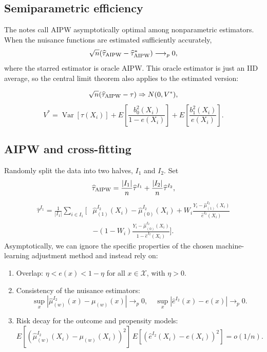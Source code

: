 \subsection{Semiparametric efficiency}
The notes call AIPW asymptotically optimal among nonparametric estimators. When the nuisance functions are estimated sufficiently accurately,
\[
\sqrt n(\widehat\tau_{\rm AIPW}-\widehat\tau^*_{\rm AIPW})\longrightarrow_p0,
\]
where the starred estimator is oracle AIPW. This oracle estimator is just an IID average, so the central limit theorem also applies to the estimated version:

\[
\sqrt n(\widehat\tau_{\rm AIPW}-\tau)\Rightarrow N(0,V^*),
\]
\[
V^*=\operatorname{Var}[\tau(X_i)]
+E\left[\frac{b_0^2(X_i)}{1-e(X_i)}\right]
+E\left[\frac{b_1^2(X_i)}{e(X_i)}\right].
\]
\subsection{AIPW and cross-fitting}
Randomly split the data into two halves, $I_1$ and $I_2$.  Set
\[
\widehat\tau_{\rm AIPW}=\frac{|I_1|}{n}\widehat\tau^{I_1}
+\frac{|I_2|}{n}\widehat\tau^{I_2},
\]
\begin{align*}
\widehat\tau^{I_1}=\frac1{|I_1|}\sum_{i\in I_1}\bigg[&\widehat\mu_{(1)}^{I_2}(X_i)-\widehat\mu_{(0)}^{I_2}(X_i)
+W_i\frac{Y_i-\widehat\mu_{(1)}^{I_2}(X_i)}{\widehat e^{I_2}(X_i)}\\
&-(1-W_i)\frac{Y_i-\widehat\mu_{(0)}^{I_2}(X_i)}{1-\widehat e^{I_2}(X_i)}\bigg].
\end{align*}
Asymptotically, we can ignore the specific properties of the chosen machine-learning adjustment method and instead rely on:
\begin{enumerate}
\item Overlap: $\eta<e(x)<1-\eta$ for all $x\in\mathcal X$, with $\eta>0$.
\item Consistency of the nuisance estimators:
\[
\sup_x|\widehat\mu_{(w)}^{I_2}(x)-\mu_{(w)}(x)|\longrightarrow_p0,
\quad \sup_x|\widehat e^{I_2}(x)-e(x)|\longrightarrow_p0.
\]
\item Risk decay for the outcome and propensity models:
\[
E[(\widehat\mu_{(w)}^{I_2}(X_i)-\mu_{(w)}(X_i))^2]\,
E[(\widehat e^{I_2}(X_i)-e(X_i))^2]=o(1/n).
\]
\end{enumerate}

